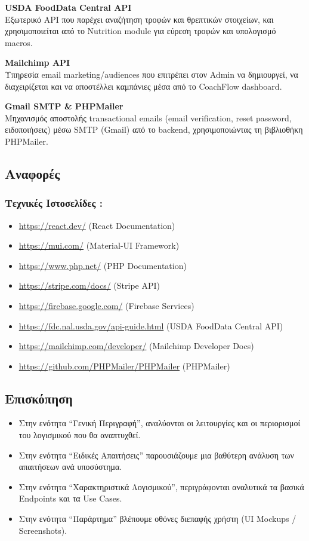 \documentclass[12pt,a4paper]{report}
\begin{document}
\textbf{USDA FoodData Central API} \\
Εξωτερικό API που παρέχει αναζήτηση τροφών και θρεπτικών στοιχείων, και χρησιμοποιείται από το Nutrition module για εύρεση τροφών και υπολογισμό macros.

\textbf{Mailchimp API} \\
Υπηρεσία email marketing/audiences που επιτρέπει στον Admin να δημιουργεί, να διαχειρίζεται και να αποστέλλει καμπάνιες μέσα από το CoachFlow dashboard.

\textbf{Gmail SMTP \& PHPMailer} \\
Μηχανισμός αποστολής transactional emails (email verification, reset password, ειδοποιήσεις) μέσω SMTP (Gmail) από το backend, χρησιμοποιώντας τη βιβλιοθήκη PHPMailer.

\subsection{Αναφορές}
\subsubsection{Τεχνικές Ιστοσελίδες :}
\begin{itemize}[label=•]
    \item \url{https://react.dev/} (React Documentation)
    \item \url{https://mui.com/} (Material-UI Framework)
    \item \url{https://www.php.net/} (PHP Documentation)
    \item \url{https://stripe.com/docs/} (Stripe API)
    \item \url{https://firebase.google.com/} (Firebase Services)
    \item \url{https://fdc.nal.usda.gov/api-guide.html} (USDA FoodData Central API)
    \item \url{https://mailchimp.com/developer/} (Mailchimp Developer Docs)
    \item \url{https://github.com/PHPMailer/PHPMailer} (PHPMailer)
\end{itemize}

\subsection{Επισκόπηση}
\begin{itemize}
    \item Στην ενότητα “Γενική Περιγραφή”, αναλύονται οι λειτουργίες και οι περιορισμοί του λογισμικού που θα αναπτυχθεί.
    \item Στην ενότητα “Ειδικές Απαιτήσεις” παρουσιάζουμε μια βαθύτερη ανάλυση των απαιτήσεων ανά υποσύστημα.
    \item Στην ενότητα “Χαρακτηριστικά Λογισμικού”, περιγράφονται αναλυτικά τα βασικά Endpoints και τα Use Cases.
    \item Στην ενότητα “Παράρτημα” βλέπουμε οθόνες διεπαφής χρήστη (UI Mockups / Screenshots).
\end{itemize}
\end{document}
